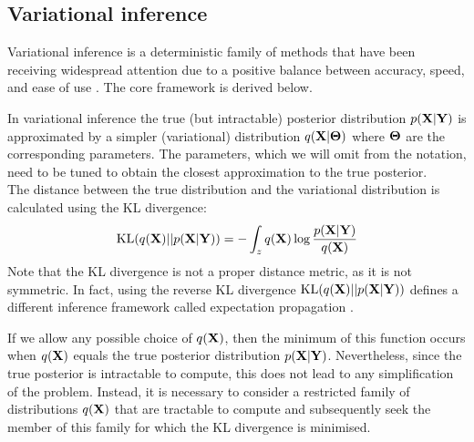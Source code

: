 \subsection{Variational inference}  \label{section:variational_inference}
Variational inference is a deterministic family of methods that have been receiving widespread attention due to a positive balance between accuracy, speed, and ease of use \cite{Blei2016, Zhang2017}. The core framework is derived below.

In variational inference the true (but intractable) posterior distribution $p({\bf X}|{\bf Y})$ is approximated by a simpler (variational) distribution $q({\bf X}|\mbox{\boldmath $\Theta$})$ where $\mbox{\boldmath $\Theta$}$ are the corresponding parameters. The parameters, which we will omit from the notation, need to be tuned to obtain the closest approximation to the true posterior.\\
The distance between the true distribution and the variational distribution is calculated using the KL divergence:
\[
{\rm KL}(q({\bf X})||p({\bf X}|{\bf Y})) = - \int_z q({\bf X}) \log \frac{p({\bf X}|{\bf Y})}{q({\bf X})}
\]
Note that the KL divergence is not a proper distance metric, as it is not symmetric. In fact, using the reverse KL divergence ${\rm KL}(q({\bf X})||p({\bf X}|{\bf Y}))$ defines a different inference framework called expectation propagation \cite{Minka2001}.

If we allow any possible choice of $q({\bf X})$, then the minimum of this function occurs when $q({\bf X})$ equals the true posterior distribution $p({\bf X}|{\bf Y})$. Nevertheless, since the true posterior is intractable to compute, this does not lead to any simplification of the problem. Instead, it is necessary to consider a restricted family of distributions $q({\bf X})$ that are tractable to compute and subsequently seek the member of this family for which the KL divergence is minimised.

